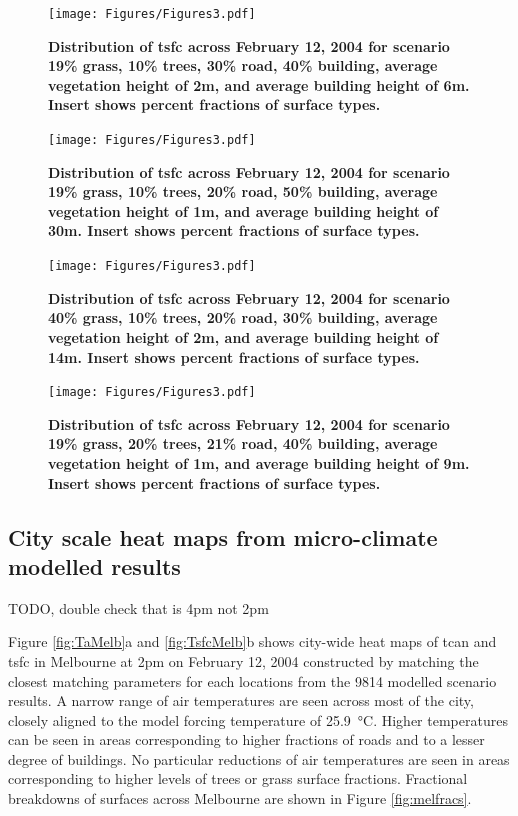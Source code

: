 \documentclass[final,3p,times,authoryear]{elsarticle}
\begin{document}
\begin{figure}
\centering
\texttt{[image: Figures/Figures3.pdf]}
\caption{\bf Distribution of \gls{tsfc} across February 12, 2004 for scenario 19\% grass, 10\% trees, 30\% road, 40\% building, average vegetation height of 2m, and average building height of 6m. Insert shows percent fractions of surface types.}
 \label{fig:dist2}
\end{figure}

\begin{figure}
\centering
\texttt{[image: Figures/Figures3.pdf]}
\caption{\bf Distribution of \gls{tsfc} across February 12, 2004 for scenario 19\% grass, 10\% trees, 20\% road, 50\% building, average vegetation height of 1m, and average building height of 30m. Insert shows percent fractions of surface types.}
 \label{fig:dist4}
\end{figure}

\begin{figure}
\centering
\texttt{[image: Figures/Figures3.pdf]}
\caption{\bf Distribution of \gls{tsfc} across February 12, 2004 for scenario 40\% grass, 10\% trees, 20\% road, 30\% building, average vegetation height of 2m, and average building height of 14m. Insert shows percent fractions of surface types.}
 \label{fig:dist6}
\end{figure}

\begin{figure}
\centering
\texttt{[image: Figures/Figures3.pdf]}
\caption{\bf Distribution of \gls{tsfc} across February 12, 2004 for scenario 19\% grass, 20\% trees, 21\% road, 40\% building, average vegetation height of 1m, and average building height of 9m. Insert shows percent fractions of surface types.}
 \label{fig:dist7}
\end{figure}



\subsection{City scale heat maps from micro-climate modelled results}\label{sec:resultsheatmaps}

TODO, double check that is 4pm not 2pm

Figure \ref{fig:TaMelb}a and \ref{fig:TsfcMelb}b shows city-wide heat maps of \gls{tcan} and \gls{tsfc} in Melbourne at 2pm on February 12, 2004 constructed by matching the closest matching parameters for each locations from the 9814 modelled scenario results. A narrow range of air temperatures are seen across most of the city, closely aligned to the model forcing temperature of 25.9\SI{}{\degreeCelsius}. Higher temperatures can be seen in areas corresponding to higher fractions of roads and to a lesser degree of buildings. No particular reductions of air temperatures are seen in areas corresponding to higher levels of trees or grass surface fractions. Fractional breakdowns of surfaces across Melbourne are shown in Figure \ref{fig:melfracs}. 
\end{document}
